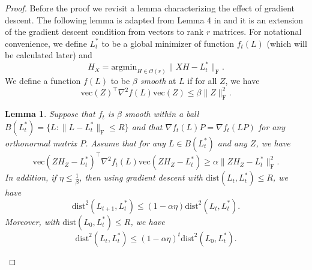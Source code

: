 \documentclass[11pt]{article}
\newcommand{\nb}[1]{\textcolor{orange}{\texttt{[#1]}}}
\newcommand{\gsc}[1]{\textcolor{blue}{\texttt{[#1]}}}
\newcommand{\dist}{\mathrm{dist}}
\newcommand{\0}{{\mathbf{0}}}
\newcommand{\ve}{{\mathrm{vec}}}
\newtheorem{lemma}[theorem]{Lemma}
\begin{document}
\begin{proof}
\par Before the proof we revisit a lemma characterizing the effect of gradient descent.
The following lemma is adapted from Lemma 4 in \cite{chi2019nonconvex} and it is an extension of the gradient descent condition from vectors to rank $r$ matrices. For notational convenience, we define $L^*_t$ to be a global minimizer of function $f_t(L)$ (which will be calculated later) and \begin{equation*}
H_X=\text{argmin}_{H\in{\mathcal{O}(r)}}\|XH-L^*_t\|_\mathrm{F}.
\end{equation*}
We define a function $f(L)$ to be \textit{$\beta$ smooth} at $L$ if for all $Z$, we have \begin{equation*}
\ve(Z)^\top \nabla^2f(L)\ve(Z)\leq \beta\|Z\|_\mathrm{F}^2.
\end{equation*}
\iffalse
\nb{By definition, if $L^*_t$ is a global minimizer, then so is $L^*_t O$ for any $O\in \mathcal{O}^{r\times r}$. 
Given the global minimizer is not unique, it would not allow you to define the ball in Lemma B.4.}
\gsc{Note that the function $f_t(L)$ has multiple global optima since we cannot distinguish $L^*_t O$ for any $O\in \mathcal{O}^{r\times r}$. For the following lemma to hold, we need to pick any one of the global minima $L_t^*$ and define the ball on it. }
\fi

\begin{lemma}\label{lemma:gradient}
Suppose that $f_t$ is $\beta$ smooth within a ball $B(L^*_t)=\{L:\|L-L^*_t\|_\mathrm{F}\leq R\}$ 
and that $\nabla f_t(L) P=\nabla f_t(LP)$ for any orthonormal matrix $P$. Assume that for any $L\in B(L^*_t)$ and any $Z$, we have\begin{equation*}
\ve (ZH_Z-L^*_t)^\top  \nabla^2f_t(L)\ve (ZH_Z-L^*_t)\geq \alpha \|ZH_Z-L^*_t\|_\mathrm{F}^2.
\end{equation*}
In addition, if $\eta \leq \frac{1}{\beta}$, then using gradient descent with $\dist(L_t,L^*_t)\leq R$, we have\begin{equation*}
\mathrm{dist}^2(L_{t+1}, L^*_t)\leq\left(1-\alpha\eta\right)\mathrm{dist}^2(L_t,L^*_t).\end{equation*}
Moreover, with $\dist(L_0,L^*_t)\leq R$, we have\begin{equation*}
\mathrm{dist}^2(L_t, L^*_t)\leq\left(1-\alpha\eta\right)^t \mathrm{dist}^2(L_0,L^*_t).
\end{equation*}
 

\end{lemma}
\end{proof}
\end{document}
